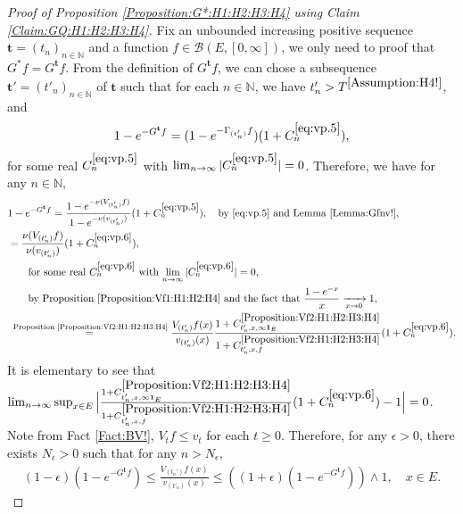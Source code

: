 \documentclass[12pt,a4paper]{amsart}
\numberwithin{equation}{section}
\theoremstyle{plain}
\theoremstyle{definition}
\theoremstyle{remark}
\newcounter{N}
\newcounter{n}[N]
\begin{document}
\begin{proof}[Proof of Proposition \ref{Proposition:G*:H1:H2:H3:H4} using Claim \ref{Claim:GQ:H1:H2:H3:H4}]
Fix an unbounded increasing positive sequence $\mathbf t=(t_n)_{n\in \mathbb N}$ and a function $f\in \mathcal B(E,[0,\infty])$, we only need to proof that $G^* f = G^{\mathbf t}f.$ 
From the definition of $G^{\mathbf t} f$, we can chose a subsequence $\mathbf t'=(t'_n)_{n \in \mathbb N}$ of $\mathbf t$ such that for each $n\in \mathbb N$, we have $t'_n > T^{\ref{Assumption:H4!}}$, and
\begin{align}
\label{eq:vp.5}
1 - e^{- G^{\mathbf t}f} =  ( 1 - e^{-\Gamma_{( t_n')} f} ) (1+C^{\eqref{eq:vp.5}}_n),
\end{align}
for some real $C^{\eqref{eq:vp.5}}_n$ with $\lim_{n\to \infty} |C^{\eqref{eq:vp.5}}_n| =0$.
Therefore, we have for any $n \in \mathbb N$,
\begin{align}
   & 1 - e^{- G^{\mathbf t}f}
   = \frac{1 - e^{- \nu( V_{(t_n')}f)}}{1- e^{- \nu(v_{(t_n')})}}  (1+C^{\eqref{eq:vp.5}}_n),\quad\text{by \eqref{eq:vp.5} and Lemma \ref{Lemma:Gfnv!}},
 \\& \label{eq:vp.6}= \frac{\nu (V_{(t_n')} f)}{\nu(v_{(t_n')})}  (1+C^{\eqref{eq:vp.6}}_n),
 \\& \qquad\text{for some real $C^{\eqref{eq:vp.6}}_n$ with $\lim_{n\to \infty} |C^{\eqref{eq:vp.6}}_n| =0$},
 \\& \qquad\text{by Proposition \ref{Proposition:Vf1:H1:H2:H4} and the fact that $\frac{1- e^{-x}}{x} \xrightarrow[x\to 0]{}1$},
  \\& \overset{\text{ Proposition \ref{Proposition:Vf2:H1:H2:H3:H4}}}=  \frac{V_{(t_n')}f(x)}{v_{(t_n')}(x)} \frac{1+C^{\ref{Proposition:Vf2:H1:H2:H3:H4}}_{t_n',x,\infty \mathbf 1_E}}{1+C^{\ref{Proposition:Vf2:H1:H2:H3:H4}}_{t_n',x,f}} (1+C^{\eqref{eq:vp.6}}_n).
 \end{align}
 It is elementary to see that $\lim_{n\to \infty} \sup_{x\in E} \Big|\frac{1+C^{\ref{Proposition:Vf2:H1:H2:H3:H4}}_{t_n',x,\infty \mathbf 1_E}}{1+C^{\ref{Proposition:Vf2:H1:H2:H3:H4}}_{t_n',x,f}} (1+C^{\eqref{eq:vp.6}}_n) -1 \Big| = 0$.
Note from Fact \ref{Fact:BV!}, $V_tf \leq v_t$ for each $t\geq 0$. 
Therefore, for any $\epsilon>0$, there exists $N_\epsilon>0$ such that for any $n>N_\epsilon$,
\begin{align}
   (1-\epsilon) (1 - e^{- G^{\mathbf t}f} )
   \leq \frac{V_{(t_n')}f(x)}{v_{(t'_n)}(x)}
   \leq ((1+\epsilon) ( 1 - e^{- G^{\mathbf t}f} )) \wedge 1,
   \quad x\in E.
 \end{align}

\end{proof}
\end{document}
